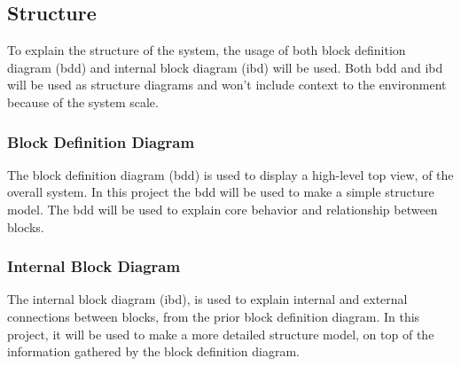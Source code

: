 \subsection{Structure}\label{sc:structure}
To explain the structure of the system, the usage of both block definition diagram (bdd) and internal block diagram (ibd) will be used. Both bdd and ibd will be used as structure diagrams and won't include context to the environment because of the system scale.


\subsubsection{Block Definition Diagram}\label{ssc:blockdefinitiondiagram}
The block definition diagram (bdd) is used to display a high-level top view, of the overall system. In this project the bdd will be used to make a simple structure model. The bdd will be used to explain core behavior and relationship between blocks.

\subsubsection{Internal Block Diagram}\label{ssc:internalblockdiagram}
The internal block diagram (ibd), is used to explain internal and external connections between blocks, from the prior block definition diagram. In this project, it will be used to make a more detailed structure model, on top of the information gathered by the block definition diagram.